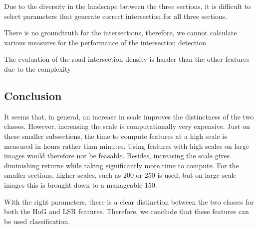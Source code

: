 Due to the diversity in the landscape between the three sections, it is difficult
to select parameters that generate correct intersection for all three sections.

There is no groundtruth for the intersections, therefore, we cannot calculate various
measures for the performance of the intersection detection


The evaluation of the road intersection density is harder than the other features
due to the complexity 

\subsection{Conclusion}

It seems that, in general, an increase in scale improves the distinctness of
the two classes. However, increasing the scale is computationally very
expensive. Just on these smaller subsections, the time to compute features at
a high scale is measured in hours rather than minutes. Using features with high
scales on large images would therefore not be feasable. Besides, increasing the
scale gives diminishing returns while taking significantly more time to
compute. For the smaller sections, higher scales, such as 200 or 250 is
used, but on large scale images this is brought down to a manageable 150.

With the right parameters, there is a clear distinction between the two classes
for both the HoG and LSR features. Therefore, we conclude that these features
can be used classification. 



